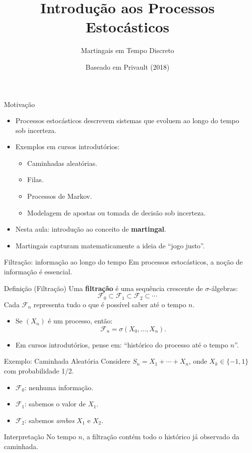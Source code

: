 \documentclass{beamer}
\title{Introdução aos Processos Estocásticos}
\subtitle{Martingais em Tempo Discreto}
\author{Baseado em Privault (2018)}
\date{}
\begin{document}
\frame{\titlepage}

\begin{frame}{Motivação}
  \begin{itemize}
    \item Processos estocásticos descrevem sistemas que evoluem ao longo do tempo sob incerteza.
    \item Exemplos em cursos introdutórios:
    \begin{itemize}
        \item Caminhadas aleatórias.
        \item Filas.
        \item Processos de Markov.
        \item Modelagem de apostas ou tomada de decisão sob incerteza.
    \end{itemize}
    \item Nesta aula: introdução ao conceito de \textbf{martingal}.
    \item Martingais capturam matematicamente a ideia de “jogo justo”.
  \end{itemize}
\end{frame}

\begin{frame}{Filtração: informação ao longo do tempo}
  Em processos estocásticos, a noção de informação é essencial.

  \begin{block}{Definição (Filtração)}
    Uma \textbf{filtração} é uma sequência crescente de $\sigma$-álgebras:
    \[
      \mathcal{F}_0 \subset \mathcal{F}_1 \subset \mathcal{F}_2 \subset \cdots
    \]
    Cada $\mathcal{F}_n$ representa tudo o que é possível saber até o tempo $n$.
  \end{block}

  \begin{itemize}
    \item Se $(X_n)$ é um processo, então:
    \[
      \mathcal{F}_n = \sigma(X_0,\ldots,X_n).
    \]
    \item Em cursos introdutórios, pense em: “histórico do processo até o tempo $n$”.
  \end{itemize}
\end{frame}

\begin{frame}{Exemplo: Caminhada Aleatória}
Considere $S_n = X_1 + \cdots + X_n$, onde $X_k \in \{-1,1\}$ com probabilidade 1/2.

\begin{itemize}
    \item $\mathcal{F}_0$: nenhuma informação.
    \item $\mathcal{F}_1$: sabemos o valor de $X_1$.
    \item $\mathcal{F}_2$: sabemos \emph{ambos} $X_1$ e $X_2$.
\end{itemize}

\begin{block}{Interpretação}
No tempo $n$, a filtração contém todo o histórico já observado da caminhada.
\end{block}
\end{frame}
\end{document}

